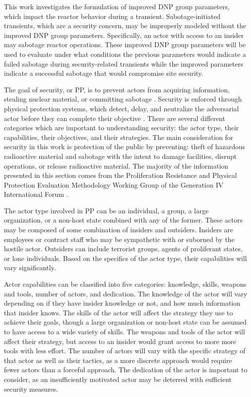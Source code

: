 This work investigates the formulation of improved \gls{DNP} group parameters, which impact the reactor behavior during a transient.
Sabotage-initiated transients, which are a security concern, may be improperly modeled without the improved \gls{DNP} group parameters.
Specifically, an actor with access to an insider may sabotage reactor operations.
These improved \gls{DNP} group parameters will be used to evaluate under what conditions the previous parameters would indicate a failed sabotage during security-related transients while the improved parameters indicate a successful sabotage that would compromise site security.

The goal of security, or \gls{PP}, is to prevent actors from acquiring information, stealing nuclear material, or committing sabotage \cite{protection2011evaluation}.
Security is enforced through physical protection systems, which detect, delay, and neutralize the adversarial actor before they can complete their objective \cite{army2001physical, garcia2007design}.
There are several different categories which are important to understanding security: the actor type, their capabilities, their objectives, and their strategies.
The main consideration for security in this work is protection of the public by preventing: theft of hazardous radioactive material and sabotage with the intent to damage facilities, disrupt operations, or release radioactive material.
The majority of the information presented in this section comes from the Proliferation Resistance and Physical Protection Evaluation Methodology Working Group of the Generation IV International Forum \cite{protection2011evaluation}.

The actor type involved in \gls{PP} can be an individual, a group, a large organization, or a non-host state combined with any of the former.
These actors may be composed of some combination of insiders and outsiders.
Insiders are employees or contract staff who may be sympathetic with or suborned by the hostile actor.
Outsiders can include terrorist groups, agents of proliferant states, or lone individuals.
Based on the specifics of the actor type, their capabilities will vary significantly.

Actor capabilities can be classified into five categories: knowledge, skills, weapons and tools, number of actors, and dedication.
The knowledge of the actor will vary depending on if they have insider knowledge or not, and how much information that insider knows.
The skills of the actor will affect the strategy they use to achieve their goals, though a large organization or non-host state can be assumed to have access to a wide variety of skills.
The weapons and tools of the actor will affect their strategy, but access to an insider would grant access to more more tools with less effort.
The number of actors will vary with the specific strategy of that actor as well as their tactics, as a more discrete approach would require fewer actors than a forceful approach.
The dedication of the actor is important to consider, as an insufficiently motivated actor may be deterred with sufficient security measures.

